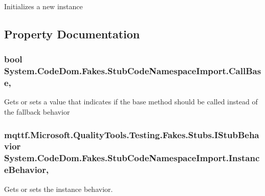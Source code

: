 Initializes a new instance



\subsection{Property Documentation}
\hypertarget{class_system_1_1_code_dom_1_1_fakes_1_1_stub_code_namespace_import_a499449f10549d12646c790770a3baa5f}{
\subsubsection[{Call\-Base}]{\setlength{\rightskip}{0pt plus 5cm}bool System.\-Code\-Dom.\-Fakes.\-Stub\-Code\-Namespace\-Import.\-Call\-Base\hspace{0.3cm}{\ttfamily [get]}, {\ttfamily [set]}}}\label{class_system_1_1_code_dom_1_1_fakes_1_1_stub_code_namespace_import_a499449f10549d12646c790770a3baa5f}


Gets or sets a value that indicates if the base method should be called instead of the fallback behavior

\hypertarget{class_system_1_1_code_dom_1_1_fakes_1_1_stub_code_namespace_import_a4a054419025aebdf5e38dbb4a68b9142}{
\subsubsection[{Instance\-Behavior}]{\setlength{\rightskip}{0pt plus 5cm}mqttf.\-Microsoft.\-Quality\-Tools.\-Testing.\-Fakes.\-Stubs.\-I\-Stub\-Behavior System.\-Code\-Dom.\-Fakes.\-Stub\-Code\-Namespace\-Import.\-Instance\-Behavior\hspace{0.3cm}{\ttfamily [get]}, {\ttfamily [set]}}}\label{class_system_1_1_code_dom_1_1_fakes_1_1_stub_code_namespace_import_a4a054419025aebdf5e38dbb4a68b9142}


Gets or sets the instance behavior.

